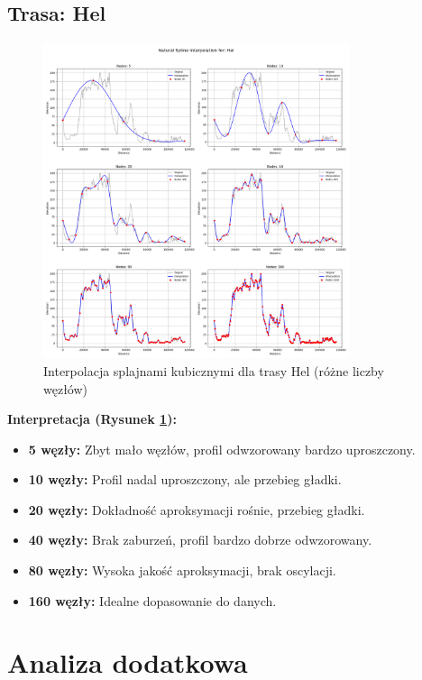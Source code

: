 \documentclass[11pt,a4paper]{article}
\begin{document}
\subsection{Trasa: Hel}
\begin{figure}[H]
    \centering
    \includegraphics[width=0.8\textwidth]{plots/Hel_Spline_basic.png}
    \caption{Interpolacja splajnami kubicznymi dla trasy Hel (różne liczby węzłów)}
    \label{fig:hej_splajny}
\end{figure}
\textbf{Interpretacja (Rysunek \ref{fig:hej_splajny}):} 
\begin{itemize}
    \item \textbf{5 węzły:} Zbyt mało węzłów, profil odwzorowany bardzo uproszczony.
    \item \textbf{10 węzły:} Profil nadal uproszczony, ale przebieg gładki.
    \item \textbf{20 węzły:} Dokładność aproksymacji rośnie, przebieg gładki.
    \item \textbf{40 węzły:} Brak zaburzeń, profil bardzo dobrze odwzorowany.
    \item \textbf{80 węzły:} Wysoka jakość aproksymacji, brak oscylacji.
    \item \textbf{160 węzły:} Idealne dopasowanie do danych.
\end{itemize}

\section{Analiza dodatkowa}
\end{document}
